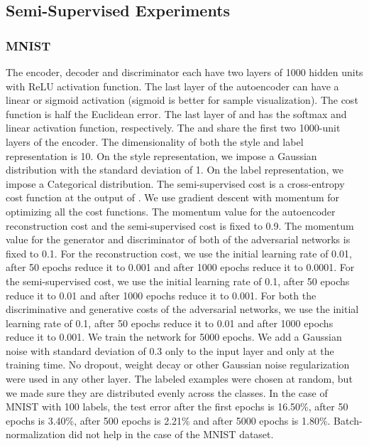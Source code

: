 \documentclass{article}
\begin{document}
\begin{appendices}
\subsection{Semi-Supervised Experiments}
\subsubsection{MNIST}\label{mnist-semi}
The encoder, decoder and discriminator each have two layers of 1000 hidden units with ReLU activation function. The last layer of the autoencoder can have a linear or sigmoid activation (sigmoid is better for sample visualization). The cost function is half the Euclidean error. The last layer of  and  has the softmax and linear activation function, respectively. The  and  share the first two 1000-unit layers of the encoder. The dimensionality of both the style and label representation is 10. On the style representation, we impose a Gaussian distribution with the standard deviation of 1. On the label representation, we impose a Categorical distribution. The semi-supervised cost is a cross-entropy cost function at the output of . We use gradient descent with momentum for optimizing all the cost functions. The momentum value for the autoencoder reconstruction cost and the semi-supervised cost is fixed to 0.9. The momentum value for the generator and discriminator of both of the adversarial networks is fixed to 0.1. For the reconstruction cost, we use the initial learning rate of 0.01, after 50 epochs reduce it to 0.001 and after 1000 epochs reduce it to 0.0001. For the semi-supervised cost, we use the initial learning rate of 0.1, after 50 epochs reduce it to 0.01 and after 1000 epochs reduce it to 0.001. For both the discriminative and generative costs of the adversarial networks, we use the initial learning rate of 0.1, after 50 epochs reduce it to 0.01 and after 1000 epochs reduce it to 0.001. We train the network for 5000 epochs. We add a Gaussian noise with standard deviation of 0.3 only to the input layer and only at the training time. No dropout,  weight decay or other Gaussian noise regularization were used in any other layer. The labeled examples were chosen at random, but we made sure they are distributed evenly across the classes. In the case of MNIST with 100 labels, the test error after the first epochs is 16.50\%, after 50 epochs is 3.40\%, after 500 epochs is 2.21\% and after 5000 epochs is 1.80\%. Batch-normalization \citep{batch} did not help in the case of the MNIST dataset.


\end{appendices}
\end{document}
